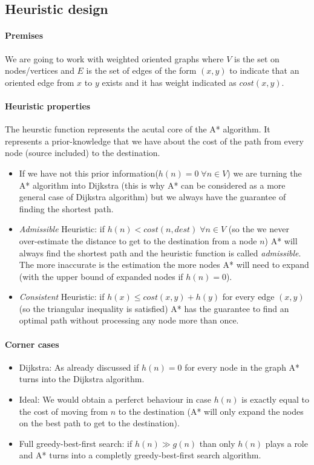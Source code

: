 \documentclass[twocolumn, switch]{article} %
\begin{document}
\subsection{Heuristic design}
\paragraph{Premises} We are going to work with weighted oriented graphs where $V$ is the set on nodes/vertices
and $E$ is the set of edges of the form $(x,y)$ to indicate that an oriented edge from $x$ to $y$ exists and it
has weight indicated as $cost(x, y)$.
\paragraph{Heuristic properties} 
The heurstic function represents the acutal core of the A* algorithm. It represents a prior-knowledge that
we have about the cost of the path from every node (source included) to the destination. 
\begin{itemize}
  \item If we have not this prior information($h(n) = 0 \;\forall n \in V$) we are turning the A* algorithm into
        Dijkstra (this is why A* can be considered as a more general case of Dijkstra algorithm) but we always
        have the guarantee of finding the shortest path. 
  \item \textit{Admissible} Heuristic: if $h(n) < cost(n, dest) \;\forall n \in V$ (so the we never over-estimate the distance to
        get to the destination from a node $n$) A* will always find the shortest path and the heuristic
        function is called \textit{admissible}. The more inaccurate
        is the estimation the more nodes A* will need to expand (with the upper bound of expanded nodes
        if $h(n) = 0$).
  \item \textit{Consistent} Heuristic: if $h(x) \le cost(x, y) + h(y)$ for every edge $(x, y)$ (so the triangular
        inequality is satisfied) A* has the guarantee to find an optimal path without processing
        any node more than once. 
\end{itemize}
\paragraph{Corner cases} 
\begin{itemize}
  \item Dijkstra: As already discussed if $h(n)=0$ for every node in the graph A* turns into the Dijkstra algorithm.
  \item Ideal: We would obtain a perferct behaviour in case $h(n)$ is exactly equal to the cost of moving from $n$ to
  the destination (A* will only expand the nodes on the best path to get to the destination).
  \item Full greedy-best-first search: if $h(n) \gg g(n)$ than only $h(n)$ plays a role and A* turns into
        a completly greedy-best-first search algorithm.
\end{itemize}
\end{document}
